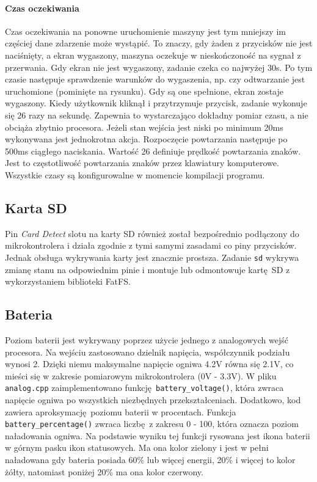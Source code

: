 \documentclass[polish]{aghengthesis}
\begin{document}
			\paragraph{Czas oczekiwania}
				Czas oczekiwania na ponowne uruchomienie maszyny jest tym mniejszy im częściej dane zdarzenie może wystąpić. To znaczy, gdy żaden z przycisków nie jest naciśnięty, a ekran wygaszony, maszyna oczekuje w nieskończoność na sygnał z przerwania. Gdy ekran nie jest wygaszony, zadanie czeka co najwyżej 30s. Po tym czasie następuje sprawdzenie warunków do wygaszenia, np. czy odtwarzanie jest uruchomione (pominięte na rysunku). Gdy są one spełnione, ekran zostaje wygaszony. Kiedy użytkownik kliknął i przytrzymuje przycisk, zadanie wykonuje się 26 razy na sekundę. Zapewnia to wystarczająco dokładny pomiar czasu, a nie obciąża zbytnio procesora. Jeżeli stan wejścia jest niski po minimum 20ms wykonywana jest jednokrotna akcja. Rozpoczęcie powtarzania następuje po 500ms ciągłego naciskania. Wartość 26 definiuje prędkość powtarzania znaków. Jest to częstotliwość powtarzania znaków przez klawiatury komputerowe. Wszystkie czasy są konfigurowalne w momencie kompilacji programu.
		
		\subsection{Karta SD}
			Pin \textit{Card Detect} slotu na karty SD również został bezpośrednio podłączony do mikrokontrolera i działa zgodnie z tymi samymi zasadami co piny przycisków. Jednak obsługa wykrywania karty jest znacznie prostsza. Zadanie \lstinline|sd| wykrywa zmianę stanu na odpowiednim pinie i montuje lub odmontowuje kartę SD z wykorzystaniem biblioteki FatFS.
			
		\subsection{Bateria}
			Poziom baterii jest wykrywany poprzez użycie jednego z analogowych wejść procesora. Na wejściu zastosowano dzielnik napięcia, współczynnik podziału wynosi 2. Dzięki niemu maksymalne napięcie ogniwa 4.2V równa się 2.1V, co mieści się w zakresie pomiarowym mikrokontrolera (0V - 3.3V). W pliku \lstinline|analog.cpp| zaimplementowano funkcję \lstinline|battery_voltage()|, która zwraca napięcie ogniwa po wszystkich niezbędnych przekształceniach. Dodatkowo, kod zawiera aproksymację poziomu baterii w procentach. Funkcja \lstinline|battery_percentage()| zwraca liczbę z zakresu 0 - 100, która oznacza poziom naładowania ogniwa. Na podstawie wyniku tej funkcji rysowana jest ikona baterii w górnym pasku ikon statusowych. Ma ona kolor zielony i jest w pełni naładowana gdy bateria posiada 60\% lub więcej energii, 20\% i więcej to kolor żółty, natomiast poniżej 20\% ma ona kolor czerwony.
		
\end{document}
